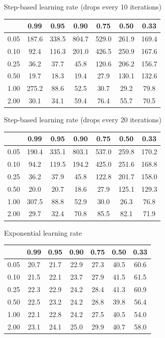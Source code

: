 \documentclass[a4paper,14pt,oneside,openany]{memoir}
\begin{document}
	Step-based learning rate (drops every 10 iterations) 
	
	\begin{tabular}{|c|c|c|c|c|c|c|}
	\hline 
	 &0.99 &0.95 &0.90 &0.75 &0.50 &0.33 \\
	 \hline 
	0.05 &187.6 &338.5 &804.7 &529.0 &261.9 &169.4 \\
	 \hline 
	0.10 &92.4 &116.3 &201.0 &426.5 &250.9 &167.6 \\
	 \hline 
	0.25 &36.2 &37.7 &45.8 &120.6 &206.2 &156.7 \\
	 \hline 
	0.50 &19.7 &18.3 &19.4 &27.9 &130.1 &132.6 \\
	 \hline 
	1.00 &275.2 &88.6 &52.5 &30.7 &29.2 &79.8 \\
	 \hline 
	2.00 &30.1 &34.1 &59.4 &76.4 &55.7 &70.5 \\
	 \hline 
	
	\end{tabular}
	
	Step-based learning rate (drops every 20 iterations) 
	
	\begin{tabular}{|c|c|c|c|c|c|c|}
	\hline 
	 &0.99 &0.95 &0.90 &0.75 &0.50 &0.33 \\
	 \hline 
	0.05 &190.4 &335.1 &803.1 &537.0 &259.8 &170.2 \\
	 \hline 
	0.10 &94.2 &119.5 &194.2 &425.0 &251.6 &168.8 \\
	 \hline 
	0.25 &36.2 &37.9 &45.8 &122.8 &201.7 &158.0 \\
	 \hline 
	0.50 &20.0 &20.7 &18.6 &27.9 &125.1 &129.3 \\
	 \hline 
	1.00 &307.5 &88.8 &52.9 &30.0 &26.3 &76.8 \\
	 \hline 
	2.00 &29.7 &32.4 &70.8 &85.5 &82.1 &71.9 \\
	 \hline 
	
	\end{tabular}
	
	Exponential learning rate 
	
	\begin{tabular}{|c|c|c|c|c|c|c|}
	\hline 
	 &0.99 &0.95 &0.90 &0.75 &0.50 &0.33 \\
	 \hline 
	0.05 &20.7 &21.7 &22.9 &27.3 &40.5 &60.6 \\
	 \hline 
	0.10 &21.5 &22.1 &23.7 &27.9 &41.5 &61.5 \\
	 \hline 
	0.25 &22.3 &22.9 &24.2 &28.4 &41.3 &60.9 \\
	 \hline 
	0.50 &22.5 &23.2 &24.2 &28.8 &39.8 &56.4 \\
	 \hline 
	1.00 &22.1 &22.8 &24.2 &27.5 &40.5 &54.0 \\
	 \hline 
	2.00 &23.1 &24.1 &25.0 &29.9 &40.7 &58.0 \\
	 \hline 
	
	\end{tabular}
	
\end{document}
